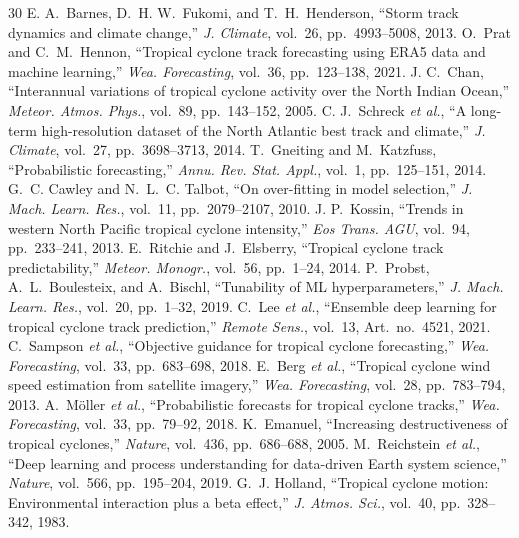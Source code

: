 \documentclass[conference]{IEEEtran}
\begin{document}
\begin{thebibliography}{30}
E. A.~Barnes, D.~H. W.~Fukomi, and T.~H.~Henderson, ``Storm track dynamics and climate change,'' \textit{J. Climate}, vol.~26, pp.~4993--5008, 2013.
O.~Prat and C.~M.~Hennon, ``Tropical cyclone track forecasting using ERA5 data and machine learning,'' \textit{Wea. Forecasting}, vol.~36, pp.~123--138, 2021.
J. C.~Chan, ``Interannual variations of tropical cyclone activity over the North Indian Ocean,'' \textit{Meteor. Atmos. Phys.}, vol.~89, pp.~143--152, 2005.
C. J.~Schreck \textit{et al.}, ``A long-term high-resolution dataset of the North Atlantic best track and climate,'' \textit{J. Climate}, vol.~27, pp.~3698--3713, 2014.
T.~Gneiting and M.~Katzfuss, ``Probabilistic forecasting,'' \textit{Annu. Rev. Stat. Appl.}, vol.~1, pp.~125--151, 2014.
G.~C. Cawley and N.~L.~C. Talbot, ``On over-fitting in model selection,'' \textit{J. Mach. Learn. Res.}, vol.~11, pp.~2079--2107, 2010.
J. P.~Kossin, ``Trends in western North Pacific tropical cyclone intensity,'' \textit{Eos Trans. AGU}, vol.~94, pp.~233--241, 2013.
E.~Ritchie and J.~Elsberry, ``Tropical cyclone track predictability,'' \textit{Meteor. Monogr.}, vol.~56, pp.~1--24, 2014.
P.~Probst, A.~L.~Boulesteix, and A.~Bischl, ``Tunability of ML hyperparameters,'' \textit{J. Mach. Learn. Res.}, vol.~20, pp.~1--32, 2019.
C.~Lee \textit{et al.}, ``Ensemble deep learning for tropical cyclone track prediction,'' \textit{Remote Sens.}, vol.~13, Art.~no.~4521, 2021.
C.~Sampson \textit{et al.}, ``Objective guidance for tropical cyclone forecasting,'' \textit{Wea. Forecasting}, vol.~33, pp.~683--698, 2018.
E.~Berg \textit{et al.}, ``Tropical cyclone wind speed estimation from satellite imagery,'' \textit{Wea. Forecasting}, vol.~28, pp.~783--794, 2013.
A.~M\"oller \textit{et al.}, ``Probabilistic forecasts for tropical cyclone tracks,'' \textit{Wea. Forecasting}, vol.~33, pp.~79--92, 2018.
K.~Emanuel, ``Increasing destructiveness of tropical cyclones,'' \textit{Nature}, vol.~436, pp.~686--688, 2005.
M.~Reichstein \textit{et al.}, ``Deep learning and process understanding for data-driven Earth system science,'' \textit{Nature}, vol.~566, pp.~195--204, 2019.
G.~J. Holland, ``Tropical cyclone motion: Environmental interaction plus a beta effect,'' \textit{J. Atmos. Sci.}, vol.~40, pp.~328--342, 1983.
\end{thebibliography}
\end{document}

